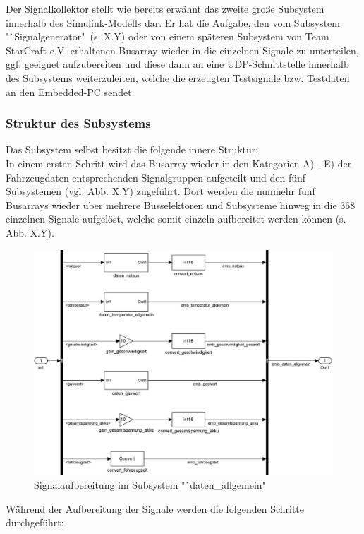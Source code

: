 \documentclass[fontsize = 12pt, paper = a4]{scrreprt}
\begin{document}
Der Signalkollektor stellt wie bereits erwähnt das zweite große Subsystem innerhalb des Simulink-Modells dar. Er hat die Aufgabe, den vom Subsystem "`Signalgenerator"\ (s. X.Y) oder von einem späteren Subsystem von Team StarCraft e.V. erhaltenen Busarray wieder in die einzelnen Signale zu unterteilen, ggf. geeignet aufzubereiten und diese dann an eine UDP-Schnittstelle innerhalb des Subsystems weiterzuleiten, welche die erzeugten Testsignale bzw. Testdaten an den Embedded-PC sendet.  

\subsubsection{Struktur des Subsystems}

Das Subsystem selbst besitzt die folgende innere Struktur: \\
In einem ersten Schritt wird das Busarray wieder in den Kategorien A) - E) der Fahrzeugdaten entsprechenden Signalgruppen aufgeteilt und den fünf Subsystemen (vgl. Abb. X.Y) zugeführt. Dort werden die nunmehr fünf Busarrays wieder über mehrere Busselektoren und Subsysteme hinweg in die 368 einzelnen Signale aufgelöst, welche somit einzeln aufbereitet werden können (s. Abb. X.Y). \\

\begin{figure}[h]
\centering
\includegraphics[scale = 0.70]{collallgemein}
\caption{Signalaufbereitung im Subsystem "`daten\_allgemein"}
\end{figure} 

\newpage


Während der Aufbereitung der Signale werden die folgenden Schritte durchgeführt:
\end{document}
